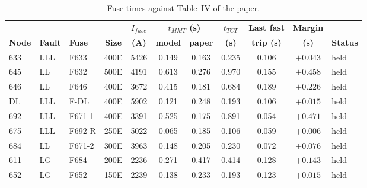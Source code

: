 \documentclass[12pt,a4paper]{article}
\begin{document}
\begin{table}[H]
\centering\footnotesize
\setlength{\tabcolsep}{4pt}
\begin{tabular}{|l|l|l|c|c|c|c|c|c|c|l|}
\hline
 & & & & \textbf{$I_{fuse}$} & \multicolumn{2}{c|}{\textbf{$t_{MMT}$ (s)}} & \textbf{$t_{TCT}$} & \textbf{Last fast} & \textbf{Margin} & \\
\textbf{Node} & \textbf{Fault} & \textbf{Fuse} & \textbf{Size} & \textbf{(A)} & \textbf{model} & \textbf{paper} & \textbf{(s)} & \textbf{trip (s)} & \textbf{(s)} & \textbf{Status} \\ \hline
633 & LLL & F633 & 400E & 5426 & 0.149 & 0.163 & 0.235 & 0.106 & $+0.043$ & held \\ \hline
645 & LL & F632 & 500E & 4191 & 0.613 & 0.276 & 0.970 & 0.155 & $+0.458$ & held \\ \hline
646 & LL & F646 & 400E & 3672 & 0.415 & 0.181 & 0.684 & 0.189 & $+0.226$ & held \\ \hline
DL & LLL & F-DL & 400E & 5902 & 0.121 & 0.248 & 0.193 & 0.106 & $+0.015$ & held \\ \hline
692 & LLL & F671-1 & 400E & 3391 & 0.525 & 0.175 & 0.891 & 0.054 & $+0.471$ & held \\ \hline
675 & LLL & F692-R & 250E & 5022 & 0.065 & 0.185 & 0.106 & 0.059 & $+0.006$ & held \\ \hline
684 & LL & F671-2 & 300E & 3963 & 0.148 & 0.205 & 0.230 & 0.072 & $+0.076$ & held \\ \hline
611 & LG & F684 & 200E & 2236 & 0.271 & 0.417 & 0.414 & 0.128 & $+0.143$ & held \\ \hline
652 & LG & F652 & 150E & 2239 & 0.138 & 0.233 & 0.193 & 0.123 & $+0.015$ & held \\ \hline
\end{tabular}
\caption{Fuse times against Table~IV of the paper.}
\label{tab:e4b}
\end{table}
\end{document}
